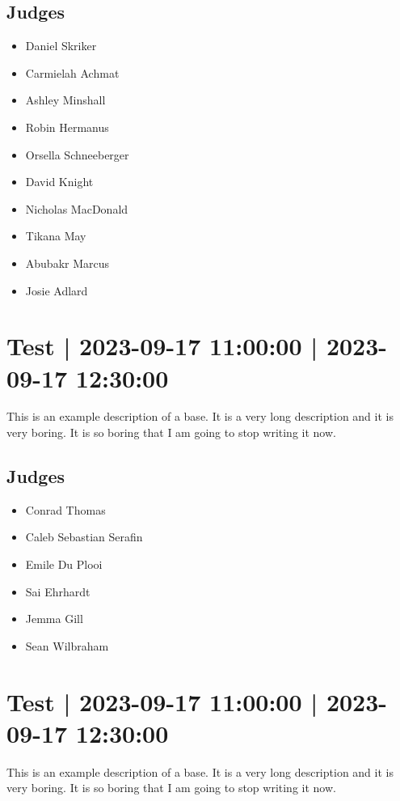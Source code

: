 \documentclass[10pt]{article}
\begin{document}
	\subsection*{Judges}
	\begin{itemize}

			\item Daniel Skriker
			\item Carmielah Achmat
			\item Ashley Minshall
			\item Robin Hermanus
			\item Orsella Schneeberger
			\item David Knight
			\item Nicholas MacDonald
			\item Tikana May
			\item Abubakr Marcus
			\item Josie Adlard
		\end{itemize}

			\setcounter{section}{40}
	\section{Test | 2023-09-17 11:00:00 | 2023-09-17 12:30:00}
	This is an example description of a base. It is a very long description and it is very boring. It is so boring that I am going to stop writing it now.

	\subsection*{Judges}
	\begin{itemize}

			\item Conrad Thomas
			\item Caleb Sebastian Serafin
			\item Emile Du Plooi
			\item Sai Ehrhardt
			\item Jemma Gill
			\item Sean Wilbraham
		\end{itemize}

			\setcounter{section}{41}
	\section{Test | 2023-09-17 11:00:00 | 2023-09-17 12:30:00}
	This is an example description of a base. It is a very long description and it is very boring. It is so boring that I am going to stop writing it now.
\end{document}
